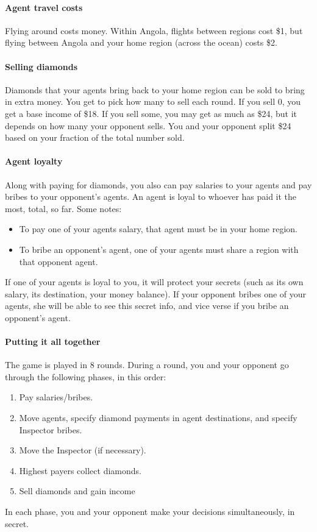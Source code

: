 \documentclass[12pt]{article}
\begin{document}
\paragraph{Agent travel costs}
Flying around costs money.  Within Angola, flights between regions cost \$1, but flying between Angola and your home region (across the ocean) costs \$2.

\paragraph{Selling diamonds}
Diamonds that your agents bring back to your home region can be sold to bring in extra money.  You get to pick how many to sell each round.  If you sell 0, you get a base income of \$18.  If you sell some, you may get as much as \$24, but it depends on how many your opponent sells.  You and your opponent split \$24 based on your fraction of the total number sold.

\paragraph{Agent loyalty}
Along with paying for diamonds, you also can pay salaries to your agents and pay bribes to your opponent's agents.  An agent is loyal to whoever has paid it the most, total, so far.  Some notes:
\begin{itemize}
\item To pay one of your agents salary, that agent must be in your home region.
\item To bribe an opponent's agent, one of your agents must share a region with that opponent agent.
\end{itemize}
If one of your agents is loyal to you, it will protect your secrets (such as its own salary, its destination, your money balance).  If your opponent bribes one of your agents, she will be able to see this secret info, and vice verse if you bribe an opponent's agent.

\paragraph{Putting it all together}
The game is played in 8 rounds.  During a round, you and your opponent go through the following phases, in this order:
\begin{enumerate}
\item Pay salaries/bribes.
\item Move agents, specify diamond payments in agent destinations, and specify Inspector bribes.
\item Move the Inspector (if necessary).
\item Highest payers collect diamonds.
\item Sell diamonds and gain income
\end{enumerate}
In each phase, you and your opponent make your decisions simultaneously, in secret.
\end{document}

